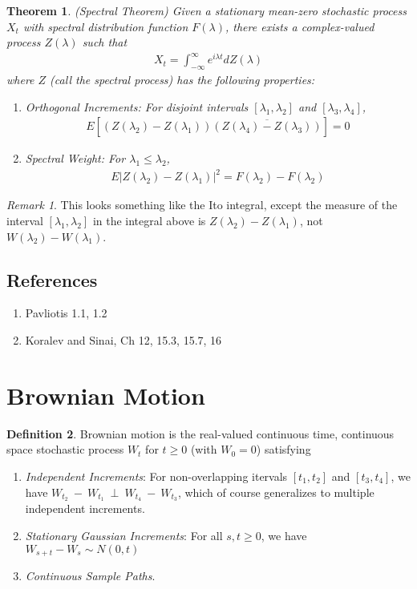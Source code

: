 \documentclass[12pt]{article}
\theoremstyle{plain}
\newtheorem{thm}{Theorem}[section]
\theoremstyle{definition}
\newtheorem{defn}[thm]{Definition}
\theoremstyle{remark}
\newtheorem*{rmk}{Remark}
\begin{document}
\begin{thm}\emph{(Spectral Theorem)}
Given a stationary mean-zero stochastic process $X_t$ with spectral
distribution function $F(\lambda)$, there exists a complex-valued
process $Z(\lambda)$ such that
\begin{align*}
  X_t = \int^\infty_{-\infty} e^{i\lambda t} dZ(\lambda)
\end{align*}
where $Z$ (call the \emph{spectral process}) has the following
properties:
\begin{enumerate}
  \item Orthogonal Increments: For disjoint intervals
    $[\lambda_1,\lambda_2]$ and $[\lambda_3,\lambda_4]$,
    \begin{align*}
      E\left[
        (Z(\lambda_2)-Z(\lambda_1))
        \overline{(Z(\lambda_4)-Z(\lambda_3))}
      \right] = 0
    \end{align*}
  \item Spectral Weight: For $\lambda_1\leq \lambda_2$,
    \begin{align*}
      E\left\lvert Z(\lambda_2)-Z(\lambda_1)\right\rvert^2
      = F(\lambda_2)-F(\lambda_2)
    \end{align*}
\end{enumerate}
\end{thm}
\begin{rmk}
This looks something like the Ito integral, except the measure of the
interval $[\lambda_1,\lambda_2]$ in the integral above is
$Z(\lambda_2)-Z(\lambda_1)$, not $W(\lambda_2)-W(\lambda_1)$.
\end{rmk}

\subsection{References}
\begin{enumerate}
  \item Pavliotis 1.1, 1.2
  \item Koralev and Sinai, Ch 12, 15.3, 15.7, 16
\end{enumerate}

\section{Brownian Motion}

\begin{defn}
Brownian motion is the real-valued continuous time, continuous space
stochastic process $W_t$ for $t\geq 0$ (with $W_0=0$) satisfying
\begin{enumerate}
  \item \emph{Independent Increments}: For non-overlapping itervals
    $[t_1,t_2]$ and $[t_3,t_4]$, we have
    $W_{t_2}~-~W_{t_1}~\perp~W_{t_4}~-~W_{t_3}$,
    which of course generalizes to multiple independent increments.
  \item \emph{Stationary Gaussian Increments}: For all $s,t\geq 0$, we
    have $W_{s+t}-W_s\sim N(0,t)$
  \item \emph{Continuous Sample Paths}.
\end{enumerate}
\end{defn}











\end{document}
